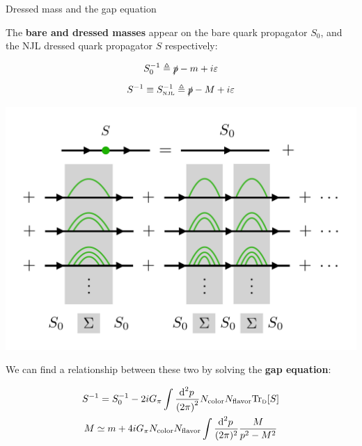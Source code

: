 \begin{frame}[allowframebreaks]{Dressed mass and the gap equation}

  \vspace{-1em}
	\begin{multicols}{2}

		The \textbf{bare and dressed masses} appear on the bare quark propagator $S_{0}$, and the NJL dressed quark propagator $S$ respectively:

		\vspace{1em}

		\begin{gather*}
		  S_0^{-1} \defeq \slashed{p} - m + i\varepsilon \\[.5em]
		  S^{-1} \equiv S^{-1}_\text{\tiny NJL} \defeq \slashed{p} - M + i\varepsilon
		\end{gather*}

		\columnbreak

		\begin{center}
			\includegraphics[width=.30\paperwidth]{Figures/chapter02/gap-equation}
		\end{center}

	\end{multicols}
  \vspace{-1em}

	We can find a relationship between these two by solving the \textbf{gap equation}:

	\begin{gather*}
		S^{-1} =
	    S_{0}^{-1} - 2iG_{\pi} \int \frac{\dd[2]{p}}{\qty(2\pi)^{2}}
	    N_\text{color} N_\text{flavor} \text{Tr}_\text{\tiny{D}}\qty[S] \\
	  M \simeq
	    m + 4iG_\pi N_\text{color} N_\text{flavor}
	    \int \frac{\dd[2]{p}}{(2\pi)^2} \frac{M}{p^2 - M^2}
	\end{gather*}


\end{frame}
